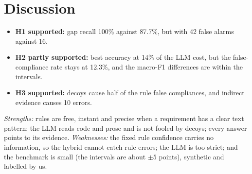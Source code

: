 \section{Discussion}
\label{section:discussion}

\begin{itemize}[leftmargin=*]
  \item \textbf{H1 supported:} gap recall 100\% against 87.7\%, but with 42 false alarms against 16.
  \item \textbf{H2 partly supported:} best accuracy at 14\% of the LLM cost, but the false-compliance rate stays at
        12.3\%, and the macro-F1 differences are within the intervals.
  \item \textbf{H3 supported:} decoys cause half of the rule false compliances, and indirect evidence causes 10 errors.
\end{itemize}
\emph{Strengths:} rules are free, instant and precise when a requirement has a clear text pattern; the LLM reads code
and prose and is not fooled by decoys; every answer points to its evidence. \emph{Weaknesses:} the fixed rule confidence
carries no information, so the hybrid cannot catch rule errors; the LLM is too strict; and the benchmark is small (the
intervals are about $\pm5$ points), synthetic and labelled by us.
